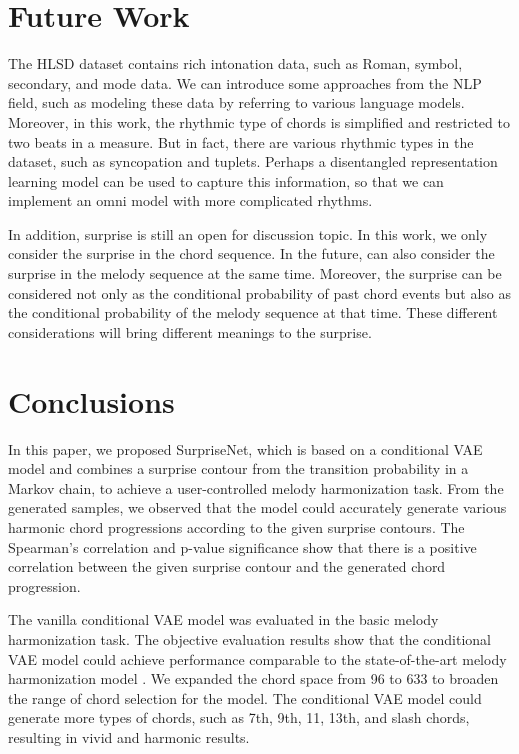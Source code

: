 \documentclass{article}
\begin{document}
\section{Future Work}

The HLSD dataset contains rich intonation data, such as Roman, symbol, secondary, and mode data. We can introduce some approaches from the NLP field, such as modeling these data by referring to various language models. Moreover, in this work, the rhythmic type of chords is simplified and restricted to two beats in a measure. But in fact, there are various rhythmic types in the dataset, such as syncopation and tuplets. Perhaps a disentangled representation learning model can be used to capture this information, so that we can implement an omni model with more complicated rhythms.

In addition, surprise is still an open for discussion topic. In this work, we only consider the surprise in the chord sequence. In the future, can also consider the surprise in the melody sequence at the same time. Moreover, the surprise can be considered not only as the conditional probability of past chord events but also as the conditional probability of the melody sequence at that time. These different considerations will bring different meanings to the surprise.

\section{Conclusions}

In this paper, we proposed SurpriseNet, which is based on a conditional VAE model and combines a surprise contour from the transition probability in a Markov chain, to achieve a user-controlled melody harmonization task. From the generated samples, we observed that the model could accurately generate various harmonic chord progressions according to the given surprise contours. The Spearman's correlation and p-value significance show that there is a positive correlation between the given surprise contour and the generated chord progression.

The vanilla conditional VAE model was evaluated in the basic melody harmonization task. The objective evaluation results show that the conditional VAE model could achieve performance comparable to the state-of-the-art melody harmonization model \cite{Sun2020}. We expanded the chord space from 96 to 633 to broaden the range of chord selection for the model. The conditional VAE model could generate more types of chords, such as 7th, 9th, 11, 13th, and slash chords, resulting in vivid and harmonic results.


\end{document}
